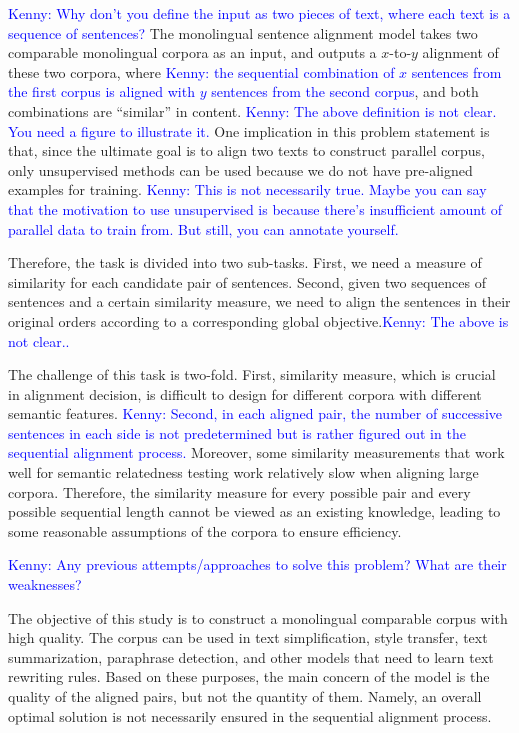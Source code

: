 \documentclass[runningheads]{llncs}
\newcommand{\KZ}[1]{\textcolor{blue}{Kenny: #1}}
\begin{document}
\KZ{Why don't you define the input as two pieces of text, where each text is
a sequence of sentences?}
The monolingual sentence alignment model takes two comparable monolingual 
corpora as an input, and outputs a $x$-to-$y$ alignment of these two corpora, 
where \KZ{the sequential combination of $x$ sentences from the first corpus is 
aligned with $y$ sentences from the second corpus}, 
and both combinations are ``similar'' in content. 
\KZ{The above definition is not clear. You need a figure to illustrate it.}
One implication in this problem statement is that, since the ultimate goal 
is to align two texts to construct parallel corpus, 
only unsupervised methods can be used because we do not have 
pre-aligned examples for training. \KZ{This is not necessarily true. 
Maybe you can say that the motivation to use unsupervised is because there's
insufficient amount of parallel data to train from. But still, you can
annotate yourself.} 

Therefore, the task is divided into two sub-tasks. 
First, we need a measure of similarity for each candidate pair of sentences. 
Second, given two sequences of sentences and a certain similarity measure, 
we need to align the sentences in their original orders according to a 
corresponding global objective.\KZ{The above is not clear..}

The challenge of this task is two-fold. First, similarity measure, which is crucial in alignment decision, is difficult to design for different corpora with different semantic features. \KZ{Second, in each aligned pair, the number of successive sentences in each side is not predetermined but is rather figured out in the sequential alignment process.} Moreover, some similarity measurements that work well for semantic relatedness testing work relatively slow when aligning large corpora. Therefore, the similarity measure for every possible pair and every possible sequential length cannot be viewed as an existing knowledge, leading to some reasonable assumptions of the corpora to ensure efficiency. 

\KZ{Any previous attempts/approaches to solve this problem? What are their
weaknesses?}

The objective of this study is to construct a monolingual comparable corpus with high quality. The corpus can be used in text simplification, style transfer, text summarization, paraphrase detection, and other models that need to learn text rewriting rules. Based on these purposes, the main concern of the model is the quality of the aligned pairs, but not the quantity of them. Namely, an overall optimal solution is not necessarily ensured in the sequential alignment process.
\end{document}
